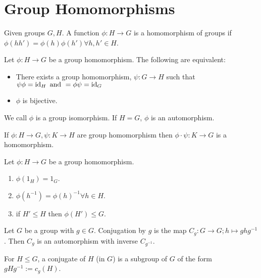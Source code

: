 \section{Group Homomorphisms}

\begin{definition}[Homomorphism]
    Given groups \(G, H\). A function \(\phi: H \to G\) is a homomorphism of groups if \(\phi(hh') = \phi(h)\phi(h') \forall h, h' \in H\).
\end{definition}


\begin{prop-defn}
Let \(\phi: H \to G\) be a group homomorphism. The following are equivalent:
\begin{itemize}
    \item There exists a group homomorphism, \(\psi: G \to H\) such that \(\psi\phi = \operatorname{id}_H \text{ and } = \phi\psi = \operatorname{id}_G\)
    \item \(\phi\) is bijective.
\end{itemize}
We call \(\phi\) is a group isomorphism. If \(H = G\), \(\phi\) is an automorphism.
\end{prop-defn}

\begin{proposition}
    If \(\phi: H \to G, \psi: K \to H\) are group homomorphism then \(\phi \cdot \psi: K \to G\) is a homomorphism.
\end{proposition}

\begin{proposition}
    Let \(\phi: H \to G\) be a group homomorphism.
    \begin{enumerate}
        \item \(\phi(1_H) = 1_G\).
        \item \(\phi(h^{-1}) = \phi(h)^{-1} \forall h \in H\).
        \item if \(H' \leq H\) then \(\phi(H') \leq G\).
    \end{enumerate}
\end{proposition}

\begin{prop-defn}
Let \(G\) be a group with \(g \in G\). Conjugation by \(g\) is the map \(C_g: G \to G; h \mapsto ghg^{-1}\). Then \(C_g\) is an automorphism with inverse \(C_{g^{-1}}\).
\end{prop-defn}

\begin{corol-defn}
For \(H \leq G\), a conjugate of \(H\) (in \(G\)) is a subgroup of \(G\) of the form \(gHg^{-1} := c_g(H)\).
\end{corol-defn}
